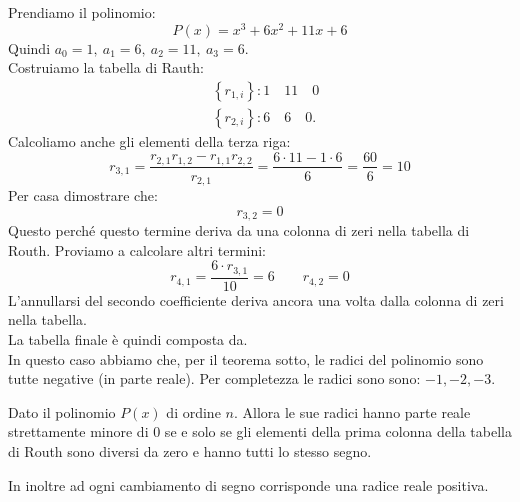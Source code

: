 \begin{exmp}
    Prendiamo il polinomio:
    \[
	P(x)=x^3 + 6x^2 + 11x + 6 
    \] 
    Quindi $a_0 = 1, \ a_1 = 6 , \ a_2 = 11, \ a_3 = 6$. \\
    Costruiamo la tabella di Rauth:
    \[\begin{aligned}
	&\left\{r_{1,i}\right\}:  1 \quad 11 \quad 0 \\
	&\left\{r_{2,i}\right\}: 6 \quad 6 \quad 0
    .\end{aligned}\]
    Calcoliamo anche gli elementi della terza riga:
    \[
	r_{3, 1}= \frac{r_{2,1}r_{1,2}-r_{1,1}r_{2,2}}{r_{2,1}}= \frac{6 \cdot  11 - 1 \cdot  6}{6} = \frac{60}{6} = 10
    \] 
    Per casa dimostrare che:
    \[
        r_{3,2} = 0
    \] 
    Questo perché questo termine deriva da una colonna di zeri nella tabella di Routh. Proviamo a calcolare altri termini:
    \[
        r_{4, 1} = \frac{6 \cdot r_{3, 1}}{10} = 6 \qquad r_{4, 2} = 0
    \] 
    L'annullarsi del secondo coefficiente deriva ancora una volta dalla colonna di zeri nella tabella.\\
    La tabella finale è quindi composta da\sidenote{
    \[
        \begin{matrix}
	    & 1 & 11& 0 \\
	    & 6 & 6 & 0 \\
	    & 10& 0 & 0 \\
	    & 6 & 0 & 0 
        \end{matrix}
    \]}.\\
     In questo caso abbiamo che, per il teorema sotto, le radici del polinomio sono tutte negative (in parte reale). Per completezza le radici sono sono: $-1, -2, -3$.
\end{exmp}
\noindent
\begin{thm}
    Dato il polinomio $P(x)$ di ordine $n$. Allora le sue radici hanno parte reale strettamente minore di $0$ se e solo se gli elementi della prima colonna della tabella di Routh sono diversi da zero e hanno tutti lo stesso segno.
\end{thm}
\noindent
In inoltre ad ogni cambiamento di segno corrisponde una radice reale positiva.
